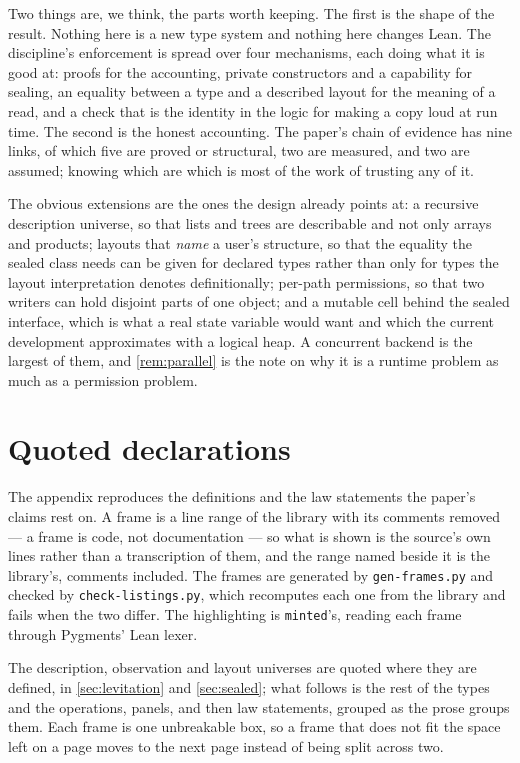 \documentclass[11pt,a4paper]{article}
\theoremstyle{definition}
\theoremstyle{plain}
\newcommand{\code}[1]{\texttt{#1}}
\begin{document}
Two things are, we think, the parts worth keeping. The first is the shape of the
result. Nothing here is a new type system and nothing here changes Lean. The
discipline's enforcement is spread over four mechanisms, each doing what it is
good at: proofs for the accounting, private constructors and a capability for
sealing, an equality between a type and a described layout for the meaning of a
read, and a check that is the identity in the logic for making a copy loud at run
time. The second is the honest accounting. The paper's chain of evidence has
nine links, of which five are proved or structural, two are measured, and two
are assumed; knowing which are which is most of the work of trusting any of it.

The obvious extensions are the ones the design already points at: a recursive
description universe, so that lists and trees are describable and not only
arrays and products; layouts that \emph{name} a user's structure, so that the
equality the sealed class needs can be given for declared types rather than only
for types the layout interpretation denotes definitionally; per-path permissions,
so that two writers can hold disjoint parts of one object; and a mutable cell
behind the sealed interface, which is what a real state variable would want and
which the current development approximates with a logical heap. A concurrent
backend is the largest of them, and \cref{rem:parallel} is the note on why it is
a runtime problem as much as a permission problem.

\appendix
\section{Quoted declarations}\label{app:listings}

The appendix reproduces the definitions and the law statements the paper's
claims rest on. A frame is a line range of the library with its comments
removed --- a frame is code, not documentation --- so what is shown is the
source's own lines rather than a transcription of them, and the range named
beside it is the library's, comments included. The frames are generated by
\code{gen-frames.py} and checked by \code{check-listings.py}, which recomputes
each one from the library and fails when the two differ. The highlighting is
\code{minted}'s, reading each frame through Pygments' Lean lexer.

The description, observation and layout universes are quoted where they are
defined, in \cref{sec:levitation} and \cref{sec:sealed}; what follows is the
rest of the types and the operations, \appendixpanelcount{} panels, and then
\lawcount{} law statements, grouped as the prose groups them. Each frame is one
unbreakable box, so a frame that does not fit the space left on a page moves to
the next page instead of being split across two.
\end{document}
